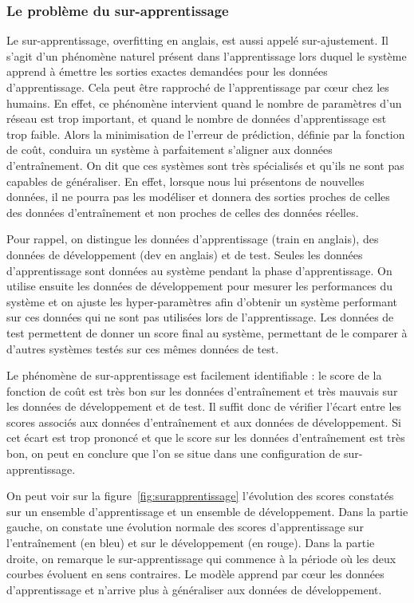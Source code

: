 \subsubsection{Le problème du sur-apprentissage}
Le sur-apprentissage, overfitting en anglais, est aussi appelé sur-ajustement. Il s'agit d'un phénomène naturel présent dans l'apprentissage lors duquel le système apprend à émettre les sorties exactes demandées pour les données d'apprentissage. Cela peut être rapproché de l'apprentissage par cœur chez les humains. En effet, ce phénomène intervient quand le nombre de paramètres d'un réseau est trop important, et quand le nombre de données d'apprentissage est trop faible. Alors la minimisation de l'erreur de prédiction, définie par la fonction de coût, conduira un système à parfaitement s'aligner aux données d’entraînement. On dit que ces systèmes sont très spécialisés et qu'ils ne sont pas capables de généraliser. En effet, lorsque nous lui présentons de nouvelles données, il ne pourra pas les modéliser et donnera des sorties proches de celles des données d’entraînement et non proches de celles des données réelles.

Pour rappel, on distingue les données d'apprentissage (train en anglais), des données de développement (dev en anglais) et de test. Seules les données d'apprentissage sont données au système pendant la phase d'apprentissage. On utilise ensuite les données de développement pour mesurer les performances du système et on ajuste les hyper-paramètres afin d'obtenir un système performant sur ces données qui ne sont pas utilisées lors de l'apprentissage. Les données de test permettent de donner un score final au système, permettant de le comparer à d'autres systèmes testés sur ces mêmes données de test.

Le phénomène de sur-apprentissage est facilement identifiable : le score de la fonction de coût est très bon sur les données d’entraînement et très mauvais sur les données de développement et de test. Il suffit donc de vérifier l'écart entre les scores associés aux données d’entraînement et aux données de développement.  Si cet écart est trop prononcé et que le score sur les données d’entraînement est très bon, on peut en conclure que l'on se situe dans une configuration de sur-apprentissage.


On peut voir sur la figure~\ref{fig:surapprentissage} l'évolution des scores constatés sur un ensemble d'apprentissage et un ensemble de développement. Dans la partie gauche, on constate une évolution normale des scores d'apprentissage sur l’entraînement (en bleu) et sur le développement (en rouge). Dans la partie droite, on remarque le sur-apprentissage qui commence à la période où les deux courbes évoluent en sens contraires. Le modèle apprend par cœur les données d'apprentissage et n'arrive plus à généraliser aux données de développement.

